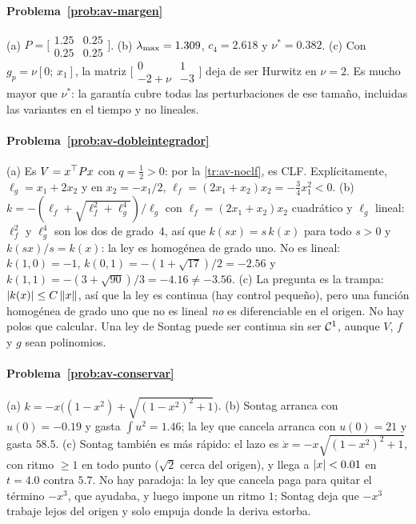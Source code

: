 \paragraph{Problema~\ref{prob:av-margen}}
(a) $P=\bigl[\begin{smallmatrix}1.25&0.25\\0.25&0.25\end{smallmatrix}\bigr]$. (b) $\lambda_{\max}=1.309$, $c_4=2.618$ y $\nu^*=0.382$. (c) Con $g_p=\nu[0;\,x_1]$, la matriz $\bigl[\begin{smallmatrix}0&1\\-2+\nu&-3\end{smallmatrix}\bigr]$ deja de ser Hurwitz en $\nu=2$. Es mucho mayor que $\nu^*$: la garantía cubre todas las perturbaciones de ese tamaño, incluidas las variantes en el tiempo y no lineales.

\paragraph{Problema~\ref{prob:av-dobleintegrador}}
(a) Es $V=x^{\top} Px$ con $q=\tfrac12>0$: por la \cref{tr:av-noclf}, es CLF. Explícitamente, $\ell_g=x_1+2x_2$ y en $x_2=-x_1/2$, $\ell_f=(2x_1+x_2)x_2=-\tfrac34x_1^2<0$. (b) $k=-(\ell_f+\sqrt{\ell_f^2+\ell_g^4})/\ell_g$ con $\ell_f=(2x_1+x_2)x_2$ cuadrático y $\ell_g$ lineal: $\ell_f^2$ y $\ell_g^4$ son los dos de grado~4, así que $k(sx)=s\,k(x)$ para todo $s>0$ y $k(sx)/s=k(x)$: la ley es homogénea de grado uno. No es lineal: $k(1,0)=-1$, $k(0,1)=-(1+\sqrt{17})/2=-2.56$ y $k(1,1)=-(3+\sqrt{90})/3=-4.16\neq-3.56$. (c) La pregunta es la trampa: $\left\lvert k(x)\right\rvert\le C\left\lVert x\right\rVert$, así que la ley es continua (hay control pequeño), pero una función homogénea de grado uno que no es lineal \emph{no} es diferenciable en el origen. No hay polos que calcular. Una ley de Sontag puede ser continua sin ser $\mathcal{C}^{1}$, aunque $V$, $f$ y $g$ sean polinomios.

\paragraph{Problema~\ref{prob:av-conservar}}
(a) $k=-x\bigl((1-x^2)+\sqrt{(1-x^2)^2+1}\bigr)$. (b) Sontag arranca con $u(0)=-0.19$ y gasta $\int u^2=1.46$; la ley que cancela arranca con $u(0)=21$ y gasta $58.5$. (c) Sontag también es más rápido: el lazo es $\dot x=-x\sqrt{(1-x^2)^2+1}$, con ritmo $\ge1$ en todo punto ($\sqrt2$ cerca del origen), y llega a $\left\lvert x\right\rvert<0.01$ en $t=4.0$ contra $5.7$. No hay paradoja: la ley que cancela paga para quitar el término $-x^3$, que ayudaba, y luego impone un ritmo $1$; Sontag deja que $-x^3$ trabaje lejos del origen y solo empuja donde la deriva estorba.

